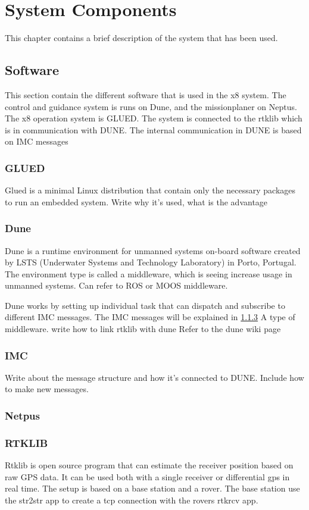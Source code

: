 
\chapter{System Components}
This chapter contains a brief description of the system that has been used.
\section{Software}
This section contain the different software that is used in the x8 system. The control and guidance system is runs on Dune, and the missionplaner on Neptus. The x8 operation system is GLUED. The system is connected to the rtklib which is in communication with DUNE. The internal communication in DUNE is based on IMC messages
\subsection{GLUED}
Glued is a minimal Linux distribution that contain only the necessary packages to run an embedded system. Write why it's used, what is the advantage
\subsection{Dune}
Dune is a runtime environment for unmanned systems on-board software created by LSTS (Underwater Systems and Technology Laboratory) in Porto, Portugal. The environment type is called a middleware, which is seeing increase usage in unmanned systems. Can refer to ROS or MOOS middleware.

Dune works by setting up individual task that can dispatch and subscribe to different IMC messages. The IMC messages will be explained in \ref{ss:IMC}
A type of middleware. write how to link rtklib with dune
Refer to the dune wiki page
\subsection{IMC}\label{ss:IMC}
Write about the message structure and how it's connected to DUNE. Include how to make new messages.
\subsection{Netpus}

\subsection{RTKLIB}
Rtklib is open source program that can estimate the receiver position based on raw GPS data. It can be used both with a single receiver or differential gps in real time. The setup is based on a base station and a rover. The base station use the str2str app to create a tcp connection with the rovers rtkrcv app.
